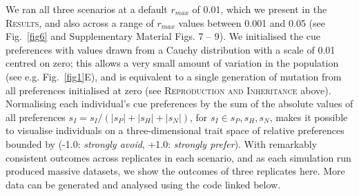 We ran all three scenarios at a default $r_{max}$ of 0.01, which we present in the \textsc{Results}, and also across a range of $r_{max}$ values between 0.001 and 0.05 (see Fig.~\ref{fig6} and Supplementary Material Figs. 7 -- 9).
We initialised the cue preferences with values drawn from a Cauchy distribution with a scale of 0.01 centred on zero; this allows a very small amount of variation in the population (see e.g. Fig.~\ref{fig1}E), and is equivalent to a single generation of mutation from all preferences initialised at zero (see \textsc{Reproduction and Inheritance} above).
Normalising each individual's cue preferences by the sum of the absolute values of all preferences $s_I = s_I / (|s_P| + |s_H| + |s_N|)$, for $s_I \in s_P, s_H, s_N$, makes it possible to visualise individuals on a three-dimensional trait space of relative preferences bounded by (-1.0: \textit{strongly avoid}, +1.0: \textit{strongly prefer}).
With remarkably consistent outcomes across replicates in each scenario, and as each simulation run produced massive datasets, we show the outcomes of three replicates here.
More data can be generated and analysed using the code linked below.





